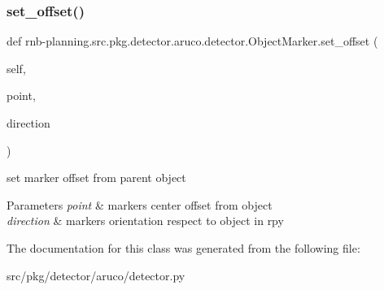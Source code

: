 \subsubsection{\texorpdfstring{set\+\_\+offset()}{set\_offset()}}
{\footnotesize\ttfamily def rnb-\/planning.\+src.\+pkg.\+detector.\+aruco.\+detector.\+Object\+Marker.\+set\+\_\+offset (\begin{DoxyParamCaption}\item[{}]{self,  }\item[{}]{point,  }\item[{}]{direction }\end{DoxyParamCaption})}



set marker offset from parent object 


\begin{DoxyParams}{Parameters}
{\em point} & marker\textquotesingle{}s center offset from object \\
\hline
{\em direction} & marker\textquotesingle{}s orientation respect to object in rpy \\
\hline
\end{DoxyParams}


The documentation for this class was generated from the following file\+:\begin{DoxyCompactItemize}
\item 
src/pkg/detector/aruco/detector.\+py\end{DoxyCompactItemize}
